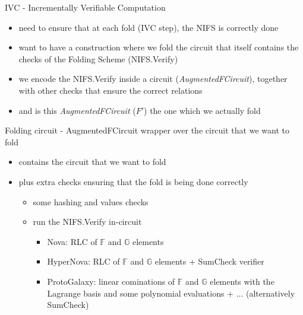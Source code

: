\documentclass[t]{beamer} \usefonttheme[onlymath]{serif}
\begin{document}
\begin{frame}{IVC - Incrementally Verifiable Computation}
  \begin{itemize}
    \item need to ensure that at each fold (IVC step), the NIFS is correctly done
    \item want to have a construction where we fold the circuit that itself contains the checks of the Folding Scheme (NIFS.Verify)
    \item we encode the NIFS.Verify inside a circuit (\emph{AugmentedFCircuit}), together with other checks that ensure the correct relations
    \item and is this \emph{AugmentedFCircuit} ($F'$) the one which we actually fold
  \end{itemize}

\end{frame}

\begin{frame}{Folding circuit - AugmentedFCircuit}
    wrapper over the circuit that we want to fold
    \begin{itemize}
      \item contains the circuit that we want to fold
      \item plus extra checks ensuring that the fold is being done correctly\\
      \begin{itemize}
        \item some hashing and values checks
        \item run the NIFS.Verify in-circuit
        \begin{itemize}
          \item Nova: RLC of $\mathbb{F}$ and $\mathbb{G}$ elements
          \item HyperNova: RLC of $\mathbb{F}$ and $\mathbb{G}$ elements + SumCheck verifier
          \item ProtoGalaxy: linear cominations of $\mathbb{F}$ and $\mathbb{G}$ elements with the Lagrange basis and some polynomial evaluations + ... (alternatively SumCheck)
        \end{itemize}
      \end{itemize}
    \end{itemize}
  

\end{frame}
\end{document}
